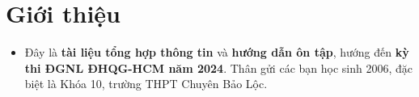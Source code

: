 \section{Giới thiệu}
\begin{itemize}
    \item Đây là \textbf{tài liệu tổng hợp thông tin} và \textbf{hướng dẫn ôn tập}, hướng đến \textbf{kỳ thi ĐGNL ĐHQG-HCM năm 2024}. Thân gửi các bạn học sinh 2006, đặc biệt là Khóa 10, trường THPT Chuyên Bảo Lộc.
\end{itemize}